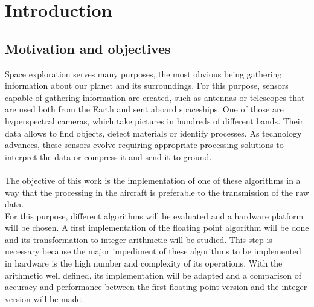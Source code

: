 \cleardoublepage
\chapter{Introduction}
\label{makereference}

\section{Motivation and objectives}
Space exploration serves many purposes, the most obvious being gathering information about our planet and its surroundings. For this purpose, sensors capable of gathering information are created, such as antennas or telescopes that are used both from the Earth and sent aboard spaceships. One of those are hyperspectral cameras, which take pictures in hundreds of different bands. Their data allows to find objects, detect materials or identify processes. As technology advances, these sensors evolve requiring appropriate processing solutions to interpret the data or compress it and send it to ground.
\\
\\
The objective of this work is the implementation of one of these algorithms in a way that the processing in the aircraft is preferable to the transmission of the raw data.
\\
For this purpose, different algorithms will be evaluated and a hardware platform will be chosen. A first implementation of the floating point algorithm will be done and its transformation to integer arithmetic will be studied. This step is necessary because the major impediment of these algorithms to be implemented in hardware is the high number and complexity of its operations. With the arithmetic well defined, its implementation will be adapted and a comparison of accuracy and performance between the first floating point version and the integer version will be made.

